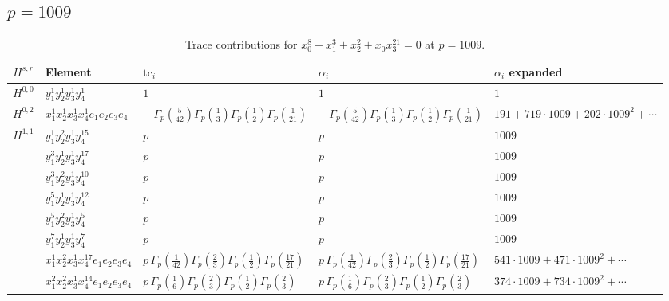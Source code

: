 \documentclass[11pt]{article}
\begin{document}
\subsection*{$p = 1009$}

\begin{table}[ht]
\centering
\caption{Trace contributions for $x_0^{8} + x_1^{3} + x_2^{2} + x_0 x_3^{21} = 0$ at $p=1009$.}\label{tab:deformed-58}
\renewcommand{\arraystretch}{1.1}
{\scriptsize
\begin{tabular}{@{}lllll@{}}
\toprule
$H^{s,r}$ & Element & $\mathrm{tc}_i$ & $\alpha_i$ & $\alpha_i$ expanded \\
\midrule
$H^{0,0}$ & $y_{1}^{1} y_{2}^{1} y_{3}^{1} y_{4}^{1}$ & $1$ & $1$ & $1$ \\
\midrule
$H^{0,2}$ & $x_{1}^{1} x_{2}^{1} x_{3}^{1} x_{4}^{1}  e_{1} e_{2} e_{3} e_{4}$ & $- \, \Gamma_p \left( \frac{5}{42} \right) \Gamma_p \left( \frac{1}{3} \right) \Gamma_p \left( \frac{1}{2} \right) \Gamma_p \left( \frac{1}{21} \right)$ & $- \, \Gamma_p \left( \frac{5}{42} \right) \Gamma_p \left( \frac{1}{3} \right) \Gamma_p \left( \frac{1}{2} \right) \Gamma_p \left( \frac{1}{21} \right)$ & $191{+}719{\cdot}1009{+}202{\cdot}1009^{2}{+}\cdots$ \\
\midrule
$H^{1,1}$ & $y_{1}^{1} y_{2}^{2} y_{3}^{1} y_{4}^{15}$ & $p \,$ & $p \,$ & $1009$ \\
 & $y_{1}^{3} y_{2}^{1} y_{3}^{1} y_{4}^{17}$ & $p \,$ & $p \,$ & $1009$ \\
 & $y_{1}^{3} y_{2}^{2} y_{3}^{1} y_{4}^{10}$ & $p \,$ & $p \,$ & $1009$ \\
 & $y_{1}^{5} y_{2}^{1} y_{3}^{1} y_{4}^{12}$ & $p \,$ & $p \,$ & $1009$ \\
 & $y_{1}^{5} y_{2}^{2} y_{3}^{1} y_{4}^{5}$ & $p \,$ & $p \,$ & $1009$ \\
 & $y_{1}^{7} y_{2}^{1} y_{3}^{1} y_{4}^{7}$ & $p \,$ & $p \,$ & $1009$ \\
 & $x_{1}^{1} x_{2}^{2} x_{3}^{1} x_{4}^{17}  e_{1} e_{2} e_{3} e_{4}$ & $p \, \Gamma_p \left( \frac{1}{42} \right) \Gamma_p \left( \frac{2}{3} \right) \Gamma_p \left( \frac{1}{2} \right) \Gamma_p \left( \frac{17}{21} \right)$ & $p \, \Gamma_p \left( \frac{1}{42} \right) \Gamma_p \left( \frac{2}{3} \right) \Gamma_p \left( \frac{1}{2} \right) \Gamma_p \left( \frac{17}{21} \right)$ & $541{\cdot}1009{+}471{\cdot}1009^{2}{+}\cdots$ \\
 & $x_{1}^{2} x_{2}^{2} x_{3}^{1} x_{4}^{14}  e_{1} e_{2} e_{3} e_{4}$ & $p \, \Gamma_p \left( \frac{1}{6} \right) \Gamma_p \left( \frac{2}{3} \right) \Gamma_p \left( \frac{1}{2} \right) \Gamma_p \left( \frac{2}{3} \right)$ & $p \, \Gamma_p \left( \frac{1}{6} \right) \Gamma_p \left( \frac{2}{3} \right) \Gamma_p \left( \frac{1}{2} \right) \Gamma_p \left( \frac{2}{3} \right)$ & $374{\cdot}1009{+}734{\cdot}1009^{2}{+}\cdots$ \\

\end{tabular}}
\end{table}
\end{document}
